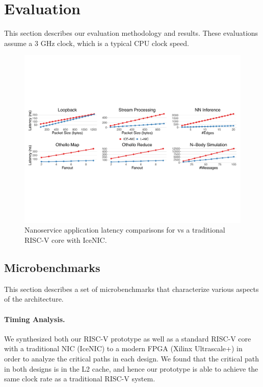 \section{Evaluation}
\label{sec:evaluation}
This section describes our evaluation methodology and results.
These evaluations assume a 3 GHz clock, which is a typical CPU clock speed.

\begin{figure}
  \includegraphics[width=\linewidth]{./figures/latency}
  \caption{Nanoservice application latency comparisons for \name{} vs a traditional RISC-V core with IceNIC.}
  \label{fig:latency}
\end{figure}


\subsection{Microbenchmarks}
This section describes a set of microbenchmarks that characterize various aspects of the \name{} architecture.

\paragraph{Timing Analysis.} We synthesized both our \name{} RISC-V prototype as well as a standard RISC-V core with a traditional NIC (IceNIC) to a modern FPGA (Xilinx Ultrascale+) in order to analyze the critical paths in each design.
We found that the critical path in both designs is in the L2 cache, and hence our \name{} prototype is able to achieve the same clock rate as a traditional RISC-V system.

